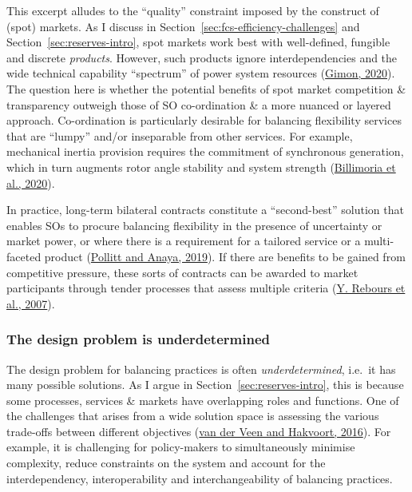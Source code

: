 \documentclass[12pt,a4paper,]{report}
\begin{document}
This excerpt alludes to the ``quality'' constraint imposed by the
construct of (spot) markets. As I discuss in
Section~\ref{sec:fcs-efficiency-challenges} and
Section~\ref{sec:reserves-intro}, spot markets work best with
well-defined, fungible and discrete \emph{products}. However, such
products ignore interdependencies and the wide technical capability
``spectrum'' of power system resources
(\protect\hyperlink{ref-gimonGridPhysicsMarkets2020}{Gimon, 2020}). The
question here is whether the potential benefits of spot market
competition \& transparency outweigh those of SO co-ordination \& a more
nuanced or layered approach. Co-ordination is particularly desirable for
balancing flexibility services that are ``lumpy'' and/or inseparable
from other services. For example, mechanical inertia provision requires
the commitment of synchronous generation, which in turn augments rotor
angle stability and system strength
(\protect\hyperlink{ref-billimoriaMarketDesignSystem2020}{Billimoria et
al., 2020}).

In practice, long-term bilateral contracts constitute a ``second-best''
solution that enables SOs to procure balancing flexibility in the
presence of uncertainty or market power, or where there is a requirement
for a tailored service or a multi-faceted product
(\protect\hyperlink{ref-pollittCompetitionMarketsAncillary2019}{Pollitt
and Anaya, 2019}). If there are benefits to be gained from competitive
pressure, these sorts of contracts can be awarded to market participants
through tender processes that assess multiple criteria
(\protect\hyperlink{ref-reboursFundamentalDesignIssues2007}{Y. Rebours
et al., 2007}).

\hypertarget{the-design-problem-is-underdetermined}{%
\subsubsection{The design problem is
underdetermined}\label{the-design-problem-is-underdetermined}}

The design problem for balancing practices is often
\emph{underdetermined}, i.e.~it has many possible solutions. As I argue
in Section~\ref{sec:reserves-intro}, this is because some processes,
services \& markets have overlapping roles and functions. One of the
challenges that arises from a wide solution space is assessing the
various trade-offs between different objectives
(\protect\hyperlink{ref-vanderveenElectricityBalancingMarket2016}{van
der Veen and Hakvoort, 2016}). For example, it is challenging for
policy-makers to simultaneously minimise complexity, reduce constraints
on the system and account for the interdependency, interoperability and
interchangeability of balancing practices.
\end{document}
